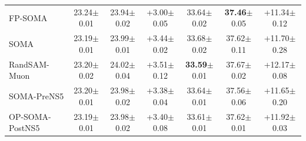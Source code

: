 \begin{table}[t]
{\begin{tabular}{lcccccc}
    FP-SOMA & 23.24{\scriptsize$\pm$0.01} & 23.94{\scriptsize$\pm$0.02} & +3.00{\scriptsize$\pm$0.05} & 33.64{\scriptsize$\pm$0.02} & \textbf{37.46}{\scriptsize$\pm$0.05} & +11.34{\scriptsize$\pm$0.12} \\
    SOMA & 23.19{\scriptsize$\pm$0.01} & 23.99{\scriptsize$\pm$0.01} & +3.44{\scriptsize$\pm$0.02} & 33.68{\scriptsize$\pm$0.02} & 37.62{\scriptsize$\pm$0.11} & +11.70{\scriptsize$\pm$0.28} \\
    RandSAM-Muon & 23.20{\scriptsize$\pm$0.02} & 24.02{\scriptsize$\pm$0.04} & +3.51{\scriptsize$\pm$0.12} & \textbf{33.59}{\scriptsize$\pm$0.01} & 37.67{\scriptsize$\pm$0.02} & +12.17{\scriptsize$\pm$0.08} \\
    SOMA-PreNS5 & 23.20{\scriptsize$\pm$0.01} & 23.98{\scriptsize$\pm$0.02} & +3.38{\scriptsize$\pm$0.04} & 33.64{\scriptsize$\pm$0.01} & 37.56{\scriptsize$\pm$0.06} & +11.65{\scriptsize$\pm$0.20} \\
    OP-SOMA-PostNS5 & 23.19{\scriptsize$\pm$0.01} & 23.98{\scriptsize$\pm$0.02} & +3.40{\scriptsize$\pm$0.08} & 33.61{\scriptsize$\pm$0.01} & 37.62{\scriptsize$\pm$0.01} & +11.92{\scriptsize$\pm$0.03} \\
    \bottomrule
  \end{tabular}}
\end{table}
